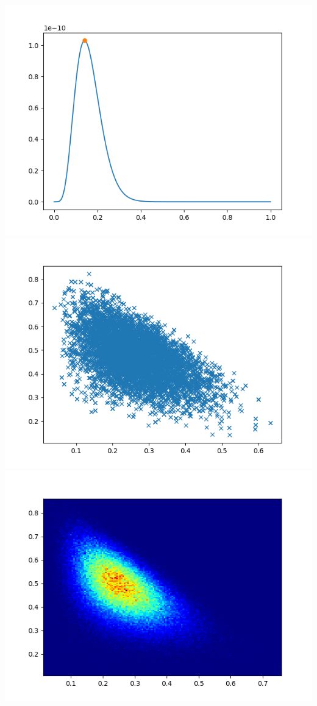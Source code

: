 \documentclass[pt12]{article}
\begin{document}
\newpage

\begin{center}
\includegraphics[scale=0.5]{hip28.png}\\
\includegraphics[scale=0.5]{sc28.png}\\
\includegraphics[scale=0.5]{den28.png}\\
\end{center}
\end{document}
